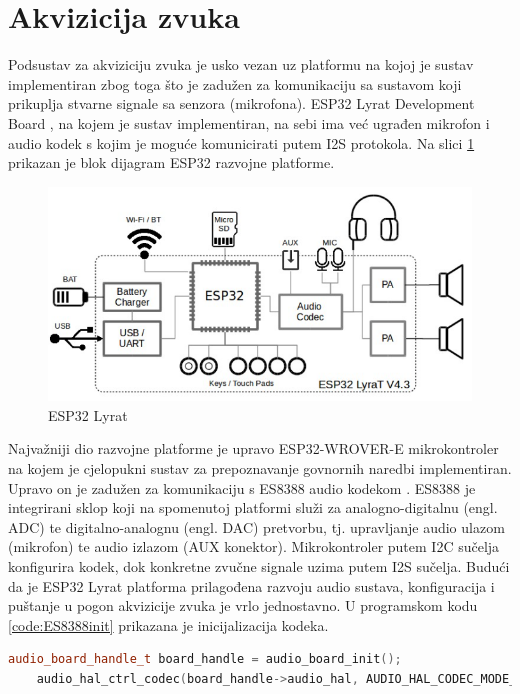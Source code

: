 \section{Akvizicija zvuka}

Podsustav za akviziciju zvuka je usko vezan uz platformu na kojoj
je sustav implementiran zbog toga što je zadužen za komunikaciju 
sa sustavom koji prikuplja stvarne signale sa senzora (mikrofona).
ESP32 Lyrat Development Board \cite{lyrat}, na kojem je sustav
implementiran, na sebi ima već ugrađen mikrofon i audio kodek
s kojim je moguće komunicirati putem I2S protokola. Na slici
\ref{pic:esp} prikazan je blok dijagram ESP32 razvojne platforme.

\begin{figure}[htb]
    \centering
    \includegraphics[width=0.6\linewidth]{Chapters/struktura_sustava/akvizicija/lyrat.png} 
    \caption{ESP32 Lyrat \cite{lyrat}}
    \label{pic:esp}
\end{figure}

Najvažniji dio razvojne platforme je upravo ESP32-WROVER-E mikrokontroler
na kojem je cjelopukni sustav za prepoznavanje govnornih naredbi 
implementiran. Upravo on je zadužen za komunikaciju s ES8388 
audio kodekom \cite{es8388}. ES8388 je integrirani sklop koji na spomenutoj
platformi služi za analogno-digitalnu (engl. ADC) te digitalno-analognu 
(engl. DAC) pretvorbu, tj. upravljanje audio ulazom (mikrofon) te audio
izlazom (AUX konektor). Mikrokontroler putem I2C sučelja konfigurira kodek,
dok konkretne zvučne signale uzima putem I2S sučelja. Budući da je ESP32 Lyrat
platforma prilagođena razvoju audio sustava, konfiguracija i puštanje u pogon
akvizicije zvuka je vrlo jednostavno. U programskom kodu \ref{code:ES8388init}
prikazana je inicijalizacija kodeka.\\

\begin{lstlisting}[language=C++, caption=Inicijalizacija kodeka]
    audio_board_handle_t board_handle = audio_board_init();
    audio_hal_ctrl_codec(board_handle->audio_hal, AUDIO_HAL_CODEC_MODE_ENCODE, AUDIO_HAL_CTRL_START);
\end{lstlisting}
\label{code:ES8388init}


